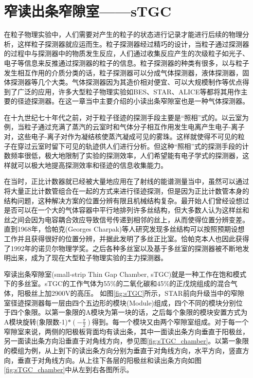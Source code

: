 \section{窄读出条窄隙室——sTGC}
\label{chap:3_2}

在粒子物理实验中，人们需要对产生的粒子的状态进行记录才能进行后续的物理分析，这样粒子探测器就应运而生。粒子探测器经过精巧的设计，当粒子通过探测器的过程中与探测器中的物质发生反应，人们通过收集反应产生的次级粒子如光子、电子等信息来反推通过探测器的粒子的信息。粒子探测器的种类有很多，以与粒子发生相互作用的介质分类的话，粒子探测器可以分成气体探测器，液体探测器，固体探测器等几个大类。气体探测器因为其造价相对便宜、可以大规模制作等优点得到了广泛的应用，许多大型粒子物理实验如BES、STAR、ALICE等都将其用作主要的径迹探测器。在这一章当中主要介绍的小读出条窄隙室也是一种气体探测器。

在十九世纪七十年代之前，对于粒子径迹的探测手段主要是“照相”式的。以云室为例，当粒子通过充满了蒸汽的云室时和气体分子相互作用发生电离产生电子-离子对，这些电子-离子对作为凝结核使蒸汽凝成可见的雾珠。这样就使得不可见的粒子在穿过云室时留下可见的轨迹供人们进行分析。但这种“照相”式的探测手段的计数频率很低，极大地限制了实验的探测效率，人们希望能有电子学式的探测器，这样就可以极大地提高探测效率和径迹的信息收集能力。

在当时，正比计数器就已经被大量地应用在了射线的能谱测量当中，虽然可以通过将大量正比计数管组合在一起的方式来进行径迹探测，但是因为正比计数管本身的结构问题，这种解决方案的位置分辨有限且机械结构复杂。最开始人们曾经设想过是否可以在一个大的气体容器中平行地排列许多丝结构，但大多数人认为这样丝和丝之间会因为电容耦合效应导致信号传递到相邻的丝上，从而使得位置分辨变差。直到1968年，恰帕克(Georges Charpak)等人研究发现多丝结构可以按照预期设想工作并且获得很好的位置分辨，并据此发明了多丝正比室。恰帕克本人也因此获得了1992年的诺贝尔物理学奖。之后各种多丝室以及基于多丝室的探测器被不断地发明出来，成为了现在大型粒子物理实验的主力探测器。

窄读出条窄隙室(small-strip Thin Gap Chamber, sTGC)就是一种工作在饱和模式下的多丝室。sTGC的工作气体为55\%的二氧化碳和45\%的正戊烷组成的混合气体，阳极丝上加2900V的高压。
如图\ref{fig:sTGC}所示，STAR前向升级当中的窄隙室径迹探测器每一层由四个五边形的模块(Module)组成，四个不同的模块分别位于四个象限。以第一象限的A模块为第一块的话，之后每个象限的模块安置方式为A模块旋转(象限数-1)$*(-\frac{\pi}{2})$得到。每一个模块又由两个窄隙室组成。对于每一个窄隙室来说，两侧的阳极板背面均有读出条，其中一面读出条方向垂直于阳极丝，另一面读出条方向沿垂直于对角线方向，参见图\ref{fig:sTGC_chamber}。以第一象限的模组为例，从上到下的读出条方向分别为垂直于对角线方向，水平方向，竖直方向，垂直于对角线方向。从上往下各层的阳极丝和读出条方向如图\ref{fig:sTGC_chamber}中从左到右各图所示。

